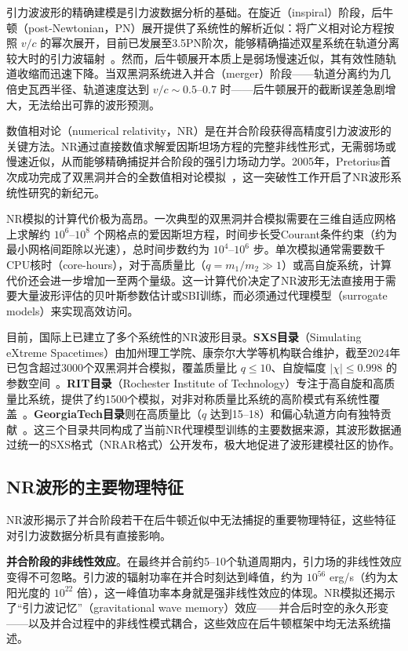 引力波波形的精确建模是引力波数据分析的基础。在旋近（inspiral）阶段，后牛顿（post-Newtonian，PN）展开提供了系统性的解析近似：将广义相对论方程按照 $v/c$ 的幂次展开，目前已发展至3.5PN阶次，能够精确描述双星系统在轨道分离较大时的引力波辐射~\cite{Blanchet2014PN}。然而，后牛顿展开本质上是弱场慢速近似，其有效性随轨道收缩而迅速下降。当双黑洞系统进入并合（merger）阶段——轨道分离约为几倍史瓦西半径、轨道速度达到 $v/c \sim 0.5$--$0.7$ 时——后牛顿展开的截断误差急剧增大，无法给出可靠的波形预测。

数值相对论（numerical relativity，NR）是在并合阶段获得高精度引力波波形的关键方法。NR通过直接数值求解爱因斯坦场方程的完整非线性形式，无需弱场或慢速近似，从而能够精确捕捉并合阶段的强引力场动力学。2005年，Pretorius首次成功完成了双黑洞并合的全数值相对论模拟~\cite{Pretorius2005NR}，这一突破性工作开启了NR波形系统性研究的新纪元。

NR模拟的计算代价极为高昂。一次典型的双黑洞并合模拟需要在三维自适应网格上求解约 $10^6$--$10^8$ 个网格点的爱因斯坦方程，时间步长受Courant条件约束（约为最小网格间距除以光速），总时间步数约为 $10^4$--$10^6$ 步。单次模拟通常需要数千CPU核时（core-hours），对于高质量比（$q = m_1/m_2 \gg 1$）或高自旋系统，计算代价还会进一步增加一至两个量级。这一计算代价决定了NR波形无法直接用于需要大量波形评估的贝叶斯参数估计或SBI训练，而必须通过代理模型（surrogate models）来实现高效访问。

目前，国际上已建立了多个系统性的NR波形目录。\textbf{SXS目录}（Simulating eXtreme Spacetimes）由加州理工学院、康奈尔大学等机构联合维护，截至2024年已包含超过3000个双黑洞并合模拟，覆盖质量比 $q \leq 10$、自旋幅度 $|\chi| \leq 0.998$ 的参数空间~\cite{Boyle2019SXS}。\textbf{RIT目录}（Rochester Institute of Technology）专注于高自旋和高质量比系统，提供了约1500个模拟，对非对称质量比系统的高阶模式有系统性覆盖~\cite{Healy2022RIT}。\textbf{GeorgiaTech目录}则在高质量比（$q$ 达到15--18）和偏心轨道方向有独特贡献~\cite{Jani2016GeorgiaTech}。这三个目录共同构成了当前NR代理模型训练的主要数据来源，其波形数据通过统一的SXS格式（NRAR格式）公开发布，极大地促进了波形建模社区的协作。

\subsection{NR波形的主要物理特征}

NR波形揭示了并合阶段若干在后牛顿近似中无法捕捉的重要物理特征，这些特征对引力波数据分析具有直接影响。

\textbf{并合阶段的非线性效应}。在最终并合前约5--10个轨道周期内，引力场的非线性效应变得不可忽略。引力波的辐射功率在并合时刻达到峰值，约为 $10^{56}$ erg/s（约为太阳光度的 $10^{22}$ 倍），这一峰值功率本身就是强非线性效应的体现。NR模拟还揭示了“引力波记忆”（gravitational wave memory）效应——并合后时空的永久形变——以及并合过程中的非线性模式耦合，这些效应在后牛顿框架中均无法系统描述。

